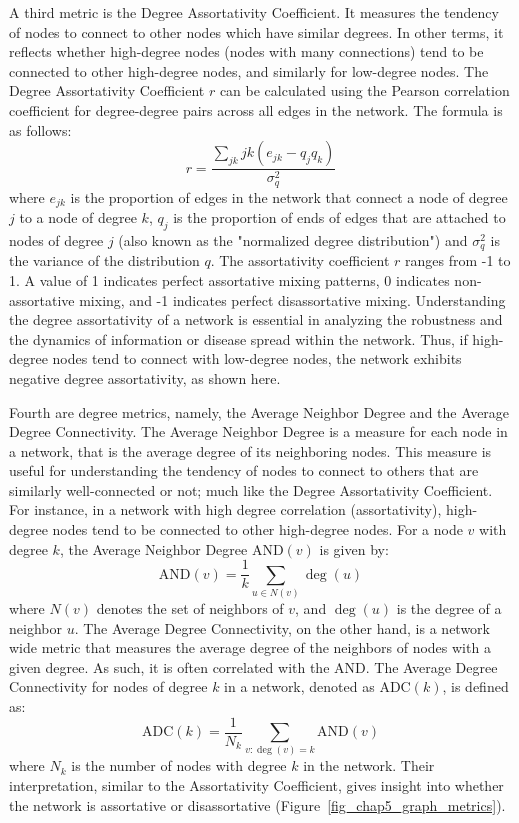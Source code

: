A third metric is the Degree Assortativity Coefficient. It measures the tendency of nodes to connect to other nodes which have similar degrees. In other terms, it reflects whether high-degree nodes (nodes with many connections) tend to be connected to other high-degree nodes, and similarly for low-degree nodes. The Degree Assortativity Coefficient \( r \) can be calculated using the Pearson correlation coefficient for degree-degree pairs across all edges in the network. The formula is as follows:
\begin{equation}
    r = \frac{\sum_{jk} jk (e_{jk} - q_j q_k)}{\sigma_q^2}
\end{equation}
where \( e_{jk} \) is the proportion of edges in the network that connect a node of degree \( j \) to a node of degree \( k \), \( q_j \) is the proportion of ends of edges that are attached to nodes of degree \( j \) (also known as the "normalized degree distribution") and \( \sigma_q^2 \) is the variance of the distribution \( q \). The assortativity coefficient \( r \) ranges from -1 to 1. A value of 1 indicates perfect assortative mixing patterns, 0 indicates non-assortative mixing, and -1 indicates perfect disassortative mixing. Understanding the degree assortativity of a network is essential in analyzing the robustness and the dynamics of information or disease spread within the network. Thus, if high-degree nodes tend to connect with low-degree nodes, the network exhibits negative degree assortativity, as shown here. 

Fourth are degree metrics, namely, the Average Neighbor Degree and the Average Degree Connectivity. 
The Average Neighbor Degree is a measure for each node in a network, that is the average degree of its neighboring nodes. This measure is useful for understanding the tendency of nodes to connect to others that are similarly well-connected or not; much like the Degree Assortativity Coefficient. For instance, in a network with high degree correlation (assortativity), high-degree nodes tend to be connected to other high-degree nodes. For a node \( v \) with degree \( k \), the Average Neighbor Degree \( \text{AND}(v) \) is given by:
\begin{equation}
    \text{AND}(v) = \frac{1}{k} \sum_{u \in N(v)} \deg(u) 
\end{equation}
where \( N(v) \) denotes the set of neighbors of \( v \), and \( \deg(u) \) is the degree of a neighbor \( u \). 
The Average Degree Connectivity, on the other hand, is a network wide metric that measures the average degree of the neighbors of nodes with a given degree. As such, it is often correlated with the $\text{AND}$. The Average Degree Connectivity for nodes of degree \( k \) in a network, denoted as \( \text{ADC}(k) \), is defined as:
\begin{equation}
    \text{ADC}(k) = \frac{1}{N_k} \sum_{v: \deg(v) = k} \text{AND}(v)
\end{equation}
where \( N_k \) is the number of nodes with degree \( k \) in the network. Their interpretation, similar to the Assortativity Coefficient, gives insight into whether the network is assortative or disassortative (Figure~\ref{fig_chap5_graph_metrics}).

